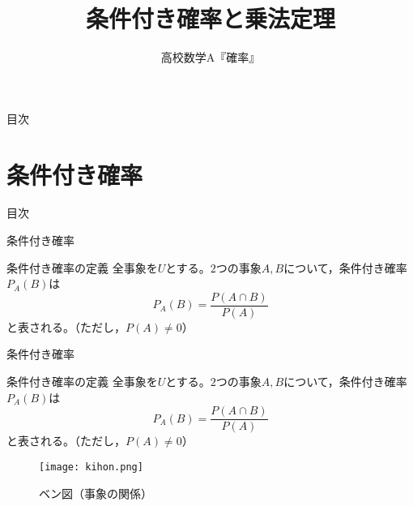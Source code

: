\documentclass[aspectratio=169, dvipdfmx, 11pt]{beamer}
\title{条件付き確率と乗法定理}
\subtitle{高校数学A『確率』}
\begin{document}
\maketitle


\begin{frame}{目次}
    \tableofcontents
\end{frame}


\section{条件付き確率}
\begin{frame}{目次}
    \tableofcontents[currentsection]
\end{frame}


\begin{frame}{条件付き確率}
    \begin{block}{条件付き確率の定義}
	全事象を$U$とする。$2$つの事象$A,B$について，条件付き確率$P_A(B)$は
	\begin{equation}
		P_A(B)=\frac{P(A\cap B)}{P(A)}
	\end{equation}
	と表される。（ただし，$P(A)\ne 0$）
    \end{block}
\end{frame}


\begin{frame}{条件付き確率}
    \begin{block}{条件付き確率の定義}
	全事象を$U$とする。$2$つの事象$A,B$について，条件付き確率$P_A(B)$は
	\begin{equation}
		P_A(B)=\frac{P(A\cap B)}{P(A)}
	\end{equation}
	と表される。（ただし，$P(A)\ne 0$）
    \end{block}

\begin{figure}[H]
  \begin{center}
    \texttt{[image: kihon.png]}
    \caption{ベン図（事象の関係）}
    \label{fig:graph5}
  \end{center}
\end{figure}

\end{frame}
\end{document}
